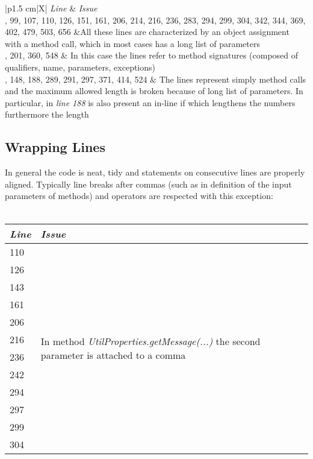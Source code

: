 \documentclass[11pt,a4paper]{report}
\begin{document}
\begin{tabularx}{\textwidth}{|p{1.5 cm}|X|}
	\hline
	\textit{Line} & \textit{Issue}\\
	\hline
	, 99, 107, 110, 126, 151, 161, 206, 214, 216, 236, 283, 294, 299, 304, 342, 344, 369, 402, 479, 503, 656 &All these lines are characterized by an object assignment with a method call, which in most cases has a long list of parameters\\
	, 201, 360, 548 & In this case the lines refer to method signatures (composed of qualifiers, name, parameters, exceptions)\\
	, 148, 188, 289, 291, 297, 371, 414, 524 & The lines represent simply method calls and the maximum allowed length is broken because of long list of parameters. In particular, in \textit{line 188} is also present an in-line if which lengthens the numbers furthermore the length \\
	\hline 
\end{tabularx}
\subsection{Wrapping Lines}
In general the code is neat, tidy and statements on consecutive lines are properly aligned. Typically line breaks after commas (such as in definition of the input parameters of methods) and operators are respected with this exception:
\\\\
\begin{tabularx}{\textwidth}{|l|X|}
	\hline
	\textit{Line} & \textit{Issue}\\
	\hline
	\hline
	110 & \multirow{12}{\linewidth}{In method \textit{UtilProperties.getMessage(...)} the second parameter is attached to a comma}\\
	126 & \\
	143 & \\
	161 & \\
	206 & \\
	216 & \\
	236 & \\
	242 & \\
	294 & \\
	297 & \\
	299 & \\
	304 & \\
	\hline
\end{tabularx}
\end{document}
